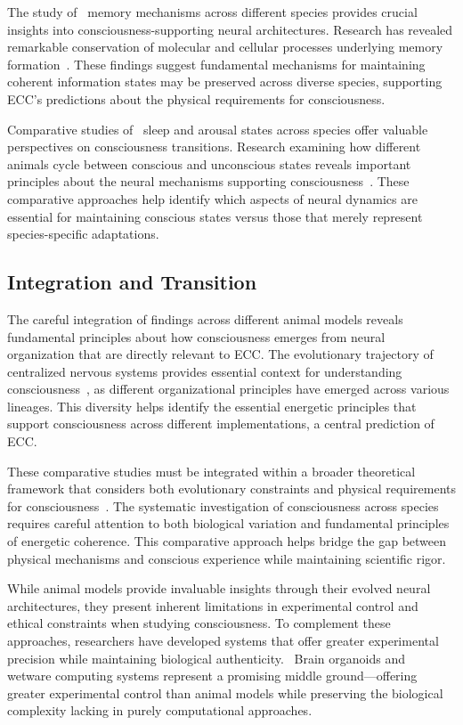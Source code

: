 The study of~ memory mechanisms across different species provides crucial insights into consciousness-supporting neural architectures. Research has revealed remarkable conservation of molecular and cellular processes underlying memory formation~\cite{kukushkin2024massed, gershman2023molecular}. These findings suggest fundamental mechanisms for maintaining coherent information states may be preserved across diverse species, supporting ECC's predictions about the physical requirements for consciousness.

Comparative studies of~ sleep and arousal states across species offer valuable perspectives on consciousness transitions. Research examining how different animals cycle between conscious and unconscious states reveals important principles about the neural mechanisms supporting consciousness~\cite{DiNuzzo2017}. These comparative approaches help identify which aspects of neural dynamics are essential for maintaining conscious states versus those that merely represent species-specific adaptations.

\subsection*{Integration and Transition}

The careful integration of findings across different animal models reveals fundamental principles about how consciousness emerges from neural organization that are directly relevant to ECC. The evolutionary trajectory of centralized nervous systems provides essential context for understanding consciousness~\cite{Northcutt2012}, as different organizational principles have emerged across various lineages. This diversity helps identify the essential energetic principles that support consciousness across different implementations, a central prediction of ECC.

These comparative studies must be integrated within a broader theoretical framework that considers both evolutionary constraints and physical requirements for consciousness~\cite{Roth2005, birch2024edge}. The systematic investigation of consciousness across species requires careful attention to both biological variation and fundamental principles of energetic coherence. This comparative approach helps bridge the gap between physical mechanisms and conscious experience while maintaining scientific rigor.

While animal models provide invaluable insights through their evolved neural architectures, they present inherent limitations in experimental control and ethical constraints when studying consciousness. To complement these approaches, researchers have developed systems that offer greater experimental precision while maintaining biological authenticity.~ Brain organoids and~ wetware computing systems represent a promising middle ground—offering greater experimental control than animal models while preserving the biological complexity lacking in purely computational approaches.

